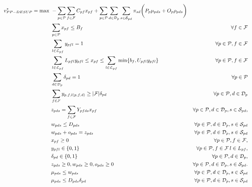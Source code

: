 \documentclass[12pt]{article}
\theoremstyle{thmstylethree}%
\begin{document}
\begin{appendices}
\begin{subequations}
\small
\label{eq:fullmodel}
\begin{align}
\label{eq:fullmodel:obj}v_{PP-DESUP}^{*} = \max~&-\sum_{p\in\mathcal{P}}\sum_{f\in\mathcal{F}}C_{pf}x_{pf}+\sum_{p\in\mathcal{P}}\sum_{d\in\mathcal{D}_p}\sum_{s\in\mathcal{S}_{pd}}\pi_{sd}\bigg(P_p \mu_{pds}+O_{p}\rho_{pds}\bigg)\\
\label{eq:model:c1b} & \sum_{p\in\mathcal{P}}x_{pf} \leq B_f & \forall f\in\mathcal{F}\\
\label{eq:fullmodel:c2} &   \sum_{l\in\mathcal{L}_{pf}}y_{pfl} =1&\forall p\in\mathcal{P}, f\in\mathcal{F}  \\
\label{eq:fullmodel:c1} &   \sum_{l\in\mathcal{L}_{pf}}L_{pfl}y_{pfl} \leq x_{pf}\leq \sum_{l\in\mathcal{L}_{pf}}\min\{b_{f},U_{pfl}y_{pfl}\}&\forall p\in\mathcal{P}, f\in\mathcal{F}\\ 
\label{eq:fullmodel:c4}    & \sum_{d\in\mathcal{D}_p}\delta_{pd} = 1 & \forall p\in\mathcal{P} \\
\label{eq:fullmodel:c3} &\sum_{f\in\mathcal{F}}y_{p,f,l(p,f,d)}\geq |\mathcal{F}|\delta_{pd} &\forall p\in\mathcal{P}, d\in \mathcal{D}_p\\
\label{eq:fullmodel:c0} &z_{pds}= \sum_{f\in\mathcal{F}}Y_{pfds}x_{pf} & \forall p\in\mathcal{P}, d\in\mathcal{D}_p, s\in\mathcal{S}_{pd}, \\
\label{eq:fullmodel:c6}  &w_{pds}\leq D_{pds}&\forall p\in\mathcal{P}, d\in\mathcal{D}_p, s\in\mathcal{S}_{pd}\\
\label{eq:fullmodel:c5}  &w_{pds} + o_{pds}= z_{pds} & \forall p\in\mathcal{P}, d\in\mathcal{D}_p, s\in\mathcal{S}_{pd}\\
\label{eq:fullmodel:fs_dvx} & x_{pf} \geq 0  &\forall p\in\mathcal{P}, f\in\mathcal{F}, \\ 
\label{eq:fullmodel:fs_dvy} & y_{pfl} \in \{0,1\} &\forall p\in\mathcal{P}, f\in\mathcal{F}\, l \in L_{pf}, \\
\label{eq:fullmodel:fs_dvd} & \delta_{pd} \in \{0,1\} &\forall p\in\mathcal{P}, d \in \mathcal{D}_{p}, \\
\label{eq:fullmodel:ss_dvs} & z_{pds} \geq 0, w_{pds} \geq 0, o_{pds} \geq 0 & \forall p \in \mathcal{P}, d \in \mathcal{D}_{p}, s \in \mathcal{S}_{pd}. \\
\label{eq:fullmodel:c7}            &\mu_{pds}\leq w_{pds}&\forall p\in\mathcal{P}, d\in\mathcal{D}_p, s\in\mathcal{S}_{pd}\\   
\label{eq:fullmodel:c8}            &\mu_{pds}\leq D_{pds}\delta_{pd}&\forall p\in\mathcal{P}, d\in\mathcal{D}_p, s\in\mathcal{S}_{pd}\\

\end{align}
\end{subequations}
\end{appendices}
\end{document}
